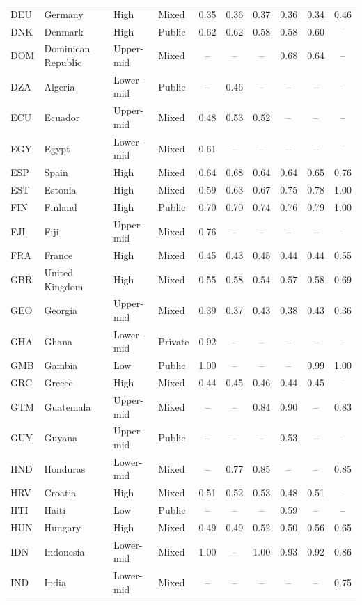 \documentclass[11pt,letterpaper]{article}
\begin{document}
\begin{longtable}{@{}llllcccccc@{}}
DEU & Germany & High & Mixed & 0.35 & 0.36 & 0.37 & 0.36 & 0.34 & 0.46 \\
DNK & Denmark & High & Public & 0.62 & 0.62 & 0.58 & 0.58 & 0.60 & -- \\
DOM & Dominican Republic & Upper-mid & Mixed & -- & -- & -- & 0.68 & 0.64 & -- \\
DZA & Algeria & Lower-mid & Public & -- & 0.46 & -- & -- & -- & -- \\
ECU & Ecuador & Upper-mid & Mixed & 0.48 & 0.53 & 0.52 & -- & -- & -- \\
EGY & Egypt & Lower-mid & Mixed & 0.61 & -- & -- & -- & -- & -- \\
ESP & Spain & High & Mixed & 0.64 & 0.68 & 0.64 & 0.64 & 0.65 & 0.76 \\
EST & Estonia & High & Mixed & 0.59 & 0.63 & 0.67 & 0.75 & 0.78 & 1.00 \\
FIN & Finland & High & Public & 0.70 & 0.70 & 0.74 & 0.76 & 0.79 & 1.00 \\
FJI & Fiji & Upper-mid & Mixed & 0.76 & -- & -- & -- & -- & -- \\
FRA & France & High & Mixed & 0.45 & 0.43 & 0.45 & 0.44 & 0.44 & 0.55 \\
GBR & United Kingdom & High & Mixed & 0.55 & 0.58 & 0.54 & 0.57 & 0.58 & 0.69 \\
GEO & Georgia & Upper-mid & Mixed & 0.39 & 0.37 & 0.43 & 0.38 & 0.43 & 0.36 \\
GHA & Ghana & Lower-mid & Private & 0.92 & -- & -- & -- & -- & -- \\
GMB & Gambia & Low & Public & 1.00 & -- & -- & -- & 0.99 & 1.00 \\
GRC & Greece & High & Mixed & 0.44 & 0.45 & 0.46 & 0.44 & 0.45 & -- \\
GTM & Guatemala & Upper-mid & Mixed & -- & -- & 0.84 & 0.90 & -- & 0.83 \\
GUY & Guyana & Upper-mid & Public & -- & -- & -- & 0.53 & -- & -- \\
HND & Honduras & Lower-mid & Mixed & -- & 0.77 & 0.85 & -- & -- & 0.85 \\
HRV & Croatia & High & Mixed & 0.51 & 0.52 & 0.53 & 0.48 & 0.51 & -- \\
HTI & Haiti & Low & Public & -- & -- & -- & 0.59 & -- & -- \\
HUN & Hungary & High & Mixed & 0.49 & 0.49 & 0.52 & 0.50 & 0.56 & 0.65 \\
IDN & Indonesia & Lower-mid & Mixed & 1.00 & -- & 1.00 & 0.93 & 0.92 & 0.86 \\
IND & India & Lower-mid & Mixed & -- & -- & -- & -- & -- & 0.75 \\

\end{longtable}
\end{document}
